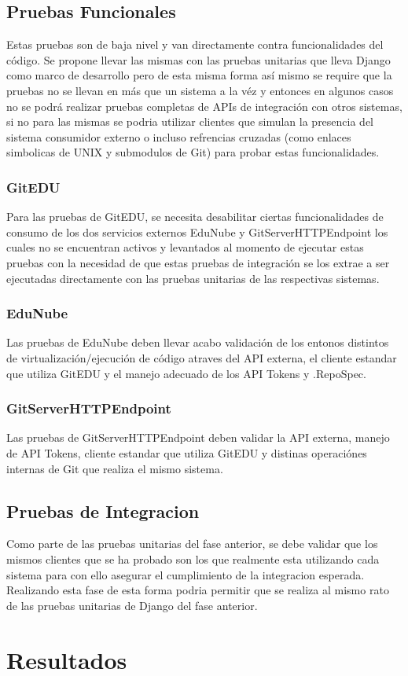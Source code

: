 \subsection{Pruebas Funcionales}
Estas pruebas son de baja nivel y van directamente contra funcionalidades del código. Se propone llevar las mismas con las pruebas unitarias que lleva Django como marco de desarrollo pero de esta misma forma así mismo se require que la pruebas no se llevan en más que un sistema a la véz y entonces en algunos casos no se podrá realizar pruebas completas de APIs de integración con otros sistemas, si no para las mismas se podria utilizar clientes que simulan la presencia del sistema consumidor externo o incluso refrencias cruzadas (como enlaces simbolicas de UNIX y submodulos de Git) para probar estas funcionalidades.

\subsubsection{GitEDU}
Para las pruebas de GitEDU, se necesita desabilitar ciertas funcionalidades de consumo de los dos servicios externos EduNube y GitServerHTTPEndpoint los cuales no se encuentran activos y levantados al momento de ejecutar estas pruebas con la necesidad de que estas pruebas de integración se los extrae a ser ejecutadas directamente con las pruebas unitarias de las respectivas sistemas.

\subsubsection{EduNube}
Las pruebas de EduNube deben llevar acabo validación de los entonos distintos de virtualización/ejecución de código atraves del API externa, el cliente estandar que utiliza GitEDU y el manejo adecuado de los API Tokens y .RepoSpec.

\subsubsection{GitServerHTTPEndpoint}
Las pruebas de GitServerHTTPEndpoint deben validar la API externa, manejo de API Tokens, cliente estandar que utiliza GitEDU y distinas operaciónes internas de Git que realiza el mismo sistema.

\subsection{Pruebas de Integracion}
Como parte de las pruebas unitarias del fase anterior, se debe validar que los mismos clientes que se ha probado son los que realmente esta utilizando cada sistema para con ello asegurar el cumplimiento de la integracion esperada. Realizando esta fase de esta forma podria permitir que se realiza al mismo rato de las pruebas unitarias de Django del fase anterior.

\section{Resultados}

